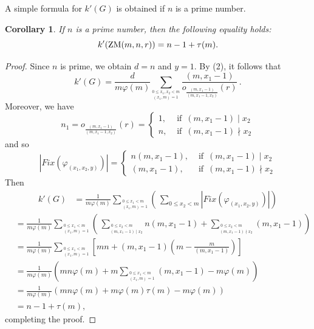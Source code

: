 \documentclass[12pt]{article}
\newtheorem{corollary}[theorem]{Corollary}
\newcommand{\dd}{\displaystyle }
\newcommand{\0}{{\leqno}}
\def\barr{\begin{array}}
\def\earr{\end{array}}
\begin{document}
A simple formula for $k'(G)$ is obtained if $n$ is a prime number.

\begin{corollary}
If $n$ is a prime number, then the following equality holds:
\begin{equation}
k'({\rm ZM}(m,n,r))=n-1+\tau(m).
\end{equation}
\end{corollary}

\begin{proof}
Since $n$ is prime, we obtain $d=n$ and $y=1$. By (2), it follows that
\begin{equation}
k'(G)=\dd\frac{d}{m\varphi(m)}\dd\sum_{^{0\leq x_1,x_2<m}_{\ (x_1,m)=1}}\frac{(m,x_1-1)}{o_{\frac{(m,x_1-1)}{(m,x_1-1,x_2)}}(r)}\,.\nonumber
\end{equation}Moreover, we have
\begin{equation}
n_1=o_{\frac{(m,x_1-1)}{(m,x_1-1,x_2)}}(r)=\left\{\barr{lll}
\!\!1, &\mbox{  if }\, (m,x_1-1)\mid x_2\\
\!\!n, &\mbox{  if }\, (m,x_1-1)\nmid x_2\earr\right.\nonumber
\end{equation}and so
\begin{equation}
|Fix(\varphi_{(x_1,x_2,y)})|=\left\{\barr{lll}
\!\!n(m,x_1-1), &\mbox{  if }\, (m,x_1-1)\mid x_2\\
\!\!(m,x_1-1), &\mbox{  if }\, (m,x_1-1)\nmid x_2\earr\right.\nonumber
\end{equation}Then
\begin{align*}
k'(G)&=\dd\frac{1}{m\varphi(m)}\!\!\dd\sum_{^{\ 0\leq x_1<m}_{\ (x_1,m)=1}}\!\!\left(\,\dd\sum_{0\leq x_2<m}|Fix(\varphi_{(x_1,x_2,y)})|\right)
\end{align*}
\begin{align*}
&=\dd\frac{1}{m\varphi(m)}\!\!\dd\sum_{^{\ 0\leq x_1<m}_{\ (x_1,m)=1}}\!\!\left(\,\dd\sum_{^{\ 0\leq x_2<m}_{(m,x_1-1)\mid x_2}}\!\!\!n(m,x_1-1)+\!\!\!\!\!\!\dd\sum_{^{\ 0\leq x_2<m}_{(m,x_1-1)\nmid x_2}}\!\!\!(m,x_1-1)\right)\\
&=\dd\frac{1}{m\varphi(m)}\!\!\dd\sum_{^{\ 0\leq x_1<m}_{\ (x_1,m)=1}}\!\!\left[mn+(m,x_1-1)\left(m-\frac{m}{(m,x_1-1)}\right)\right]\\
&=\dd\frac{1}{m\varphi(m)}\left(mn\varphi(m)+m\!\!\!\dd\sum_{^{\ 0\leq x_1<m}_{\ (x_1,m)=1}}(m,x_1-1)-m\varphi(m)\right)\\
&=\dd\frac{1}{m\varphi(m)}\left(mn\varphi(m)+m\varphi(m)\tau(m)-m\varphi(m)\right)\\
&=n-1+\tau(m),
\end{align*}completing the proof.
\end{proof}
\end{document}
